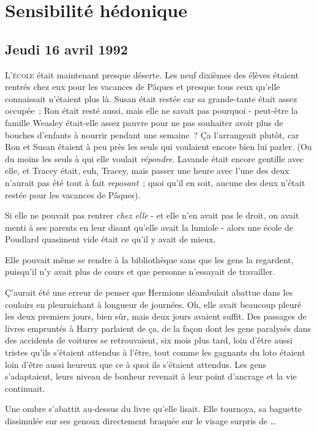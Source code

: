 \chapter{Sensibilité hédonique}

\section{Jeudi 16 avril 1992}

\lettrine{L}{'école}  était maintenant presque déserte. Les neuf dixièmes des élèves étaient rentrés chez eux pour les vacances de Pâques et presque tous ceux qu'elle connaissait n'étaient plus là. Susan était restée car sa grande-tante était assez occupée~; Ron était resté aussi, mais elle ne savait pas pourquoi - peut-être la famille Weasley était-elle assez pauvre pour ne pas souhaiter avoir plus de bouches d'enfants à nourrir pendant une semaine~? Ça l'arrangeait plutôt, car Ron et Susan étaient à peu près les seuls qui voulaient encore bien lui parler. (Ou du moins les seuls à qui elle voulait \emph{répondre}. Lavande était encore gentille avec elle, et Tracey était, euh, Tracey, mais passer une heure avec l'une des deux n'aurait pas été tout à fait \emph{reposant}~; quoi qu'il en soit, aucune des deux n'était restée pour les vacances de Pâques).

Si elle ne pouvait pas rentrer \emph{chez elle} - et elle n'en avait pas le droit, on avait menti à ses parents en leur disant qu'elle avait la lumiole - alors une école de Poudlard quasiment vide était ce qu'il y avait de mieux.

Elle pouvait même se rendre à la bibliothèque sans que les gens la regardent, puisqu'il n'y avait plus de cours et que personne n'essayait de travailler.

Ç'aurait été une erreur de penser que Hermione déambulait abattue dans les couloirs en pleurnichant à longueur de journées. Oh, elle avait beaucoup pleuré les deux premiers jours, bien sûr, mais deux jours avaient suffit. Des passages de livres empruntés à Harry parlaient de ça, de la façon dont les gens paralysés dans des accidents de voitures se retrouvaient, six mois plus tard, loin d'être aussi tristes qu'ils s'étaient attendus à l'être, tout comme les gagnants du loto étaient loin d'être aussi heureux que ce à quoi ils s'étaient attendus. Les gens s'adaptaient, leurs niveau de bonheur revenait à leur point d'ancrage et la vie continuait.

Une ombre s'abattit au-dessus du livre qu'elle lisait. Elle tournoya, sa baguette dissimulée sur ses genoux directement braquée sur le visage surpris de …

